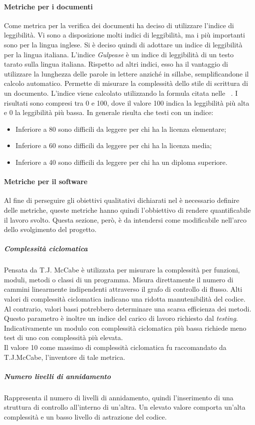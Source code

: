 \paragraph{Metriche per i documenti}
Come metrica per la verifica dei documenti \gruppo ha deciso di utilizzare l’indice di leggibilità.
Vi sono a disposizione molti indici di leggibilità, ma i più importanti sono per la lingua inglese. Si è deciso quindi di adottare un indice di leggibilità per la lingua italiana.
L’indice \textit{Gulpease} è un indice di leggibilità di un testo tarato sulla lingua italiana. Rispetto ad altri indici, esso ha il vantaggio di utilizzare la lunghezza delle parole in lettere anziché in sillabe, semplificandone il calcolo automatico. Permette di misurare la complessità dello stile di scrittura di un documento.
L’indice viene calcolato utilizzando la formula citata nelle \infoNDP~.
I risultati sono compresi tra 0 e 100, dove il valore 100 indica la leggibilità più alta e 0 la leggibilità più bassa. In generale risulta che testi con un indice:
\begin{itemize}
\item Inferiore a 80 sono difficili da leggere per chi ha la licenza elementare;
\item Inferiore a 60 sono difficili da leggere per chi ha la licenza media;
\item Inferiore a 40 sono difficili da leggere per chi ha un diploma superiore.
\end{itemize}

\paragraph{Metriche per il software}
Al fine di perseguire gli obiettivi qualitativi dichiarati nel \PianoDiQualifica{} è necessario definire delle metriche, queste metriche hanno quindi l'obbiettivo di rendere quantificabile il lavoro svolto. Questa sezione, però, è da intendersi come modificabile nell'arco dello svolgimento del progetto.
\subparagraph{Complessità ciclomatica}
Pensata da T.J. McCabe è utilizzata per misurare la complessità per funzioni, moduli, metodi o classi di un programma. Misura direttamente il numero di cammini linearmente indipendenti attraverso il grafo di controllo di flusso.
Alti valori di complessità ciclomatica indicano una ridotta manutenibilità del codice. Al contrario, valori bassi potrebbero determinare una scarsa efficienza dei metodi. Questo parametro è inoltre un indice del carico di lavoro richiesto dal \textit{testing}. Indicativamente un modulo con complessità ciclomatica più bassa richiede meno test di uno con complessità più elevata.\\
Il valore 10 come massimo di complessità ciclomatica fu raccomandato da T.J.McCabe, l'inventore di tale metrica.
\subparagraph{Numero livelli di annidamento}
Rappresenta il numero di livelli di annidamento, quindi l'inserimento di una struttura di controllo all'interno di un'altra. Un elevato valore comporta un'alta complessità e un basso livello di astrazione del codice.\\

